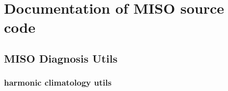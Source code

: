 \documentclass[letterpaper,10pt,english]{sphinxmanual}
\begin{document}
\chapter{Documentation of \textbf{MISO} source code}
\label{miso:miso}\label{miso:documentation-of-miso-source-code}\label{miso::doc}

\section{MISO Diagnosis Utils}
\label{miso:miso-diagnosis-utils}

\subsection{harmonic climatology utils}
\label{miso:harmonic-climatology-utils}\label{miso:module-harmonic_util}
\end{document}
